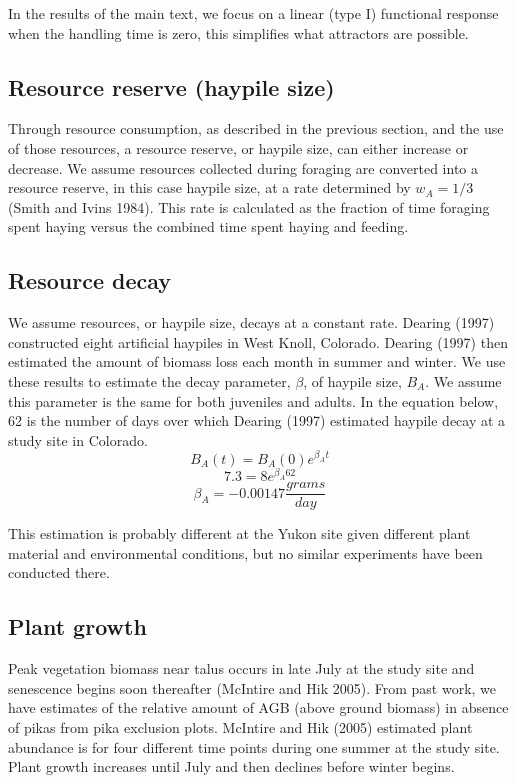 \documentclass[12pt,]{article}
\begin{document}
In the results of the main text, we focus on a linear (type I)
functional response when the handling time is zero, this simplifies what
attractors are possible.

\subsection{Resource reserve (haypile size)}

Through resource consumption, as described in the previous section, and
the use of those resources, a resource reserve, or haypile size, can
either increase or decrease. We assume resources collected during
foraging are converted into a resource reserve, in this case haypile
size, at a rate determined by \(w_A = 1/3\) (Smith and Ivins 1984). This
rate is calculated as the fraction of time foraging spent haying versus
the combined time spent haying and feeding.

\subsection{Resource decay}

We assume resources, or haypile size, decays at a constant rate. Dearing
(1997) constructed eight artificial haypiles in West Knoll, Colorado.
Dearing (1997) then estimated the amount of biomass loss each month in
summer and winter. We use these results to estimate the decay parameter,
\(\beta\), of haypile size, \(B_A\). We assume this parameter is the
same for both juveniles and adults. In the equation below, 62 is the
number of days over which Dearing (1997) estimated haypile decay at a
study site in Colorado. \[
  B_A(t) = B_A(0) e^{\beta_A t}
  \] \[
  7.3 = 8 e^{\beta_A 62}
  \] \[
  \beta_A = -0.00147 \frac{grams}{day}
  \]

This estimation is probably different at the Yukon site given different
plant material and environmental conditions, but no similar experiments
have been conducted there.

\subsection{Plant growth}

Peak vegetation biomass near talus occurs in late July at the study site
and senescence begins soon thereafter (McIntire and Hik 2005). From past
work, we have estimates of the relative amount of AGB (above ground
biomass) in absence of pikas from pika exclusion plots. McIntire and Hik
(2005) estimated plant abundance is for four different time points
during one summer at the study site. Plant growth increases until July
and then declines before winter begins.
\end{document}
